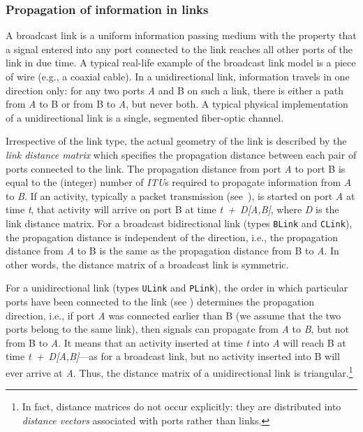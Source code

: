 \subsubsection{Propagation of information in links}
\label{rm_to_li_pr}

A broadcast link is a uniform information passing medium with the
property that a signal entered into any port connected to the link
reaches all other ports of the link in due time.
A typical real-life example of the broadcast link model is a piece of
wire (e.g., a coaxial cable).
In a unidirectional link, information travels in one direction only: for any two
ports {\em A\/} and {\rm B\/} on such a link, there is either a path from {\em A\/} to {\rm B\/} or
from {\rm B\/} to {\em A\/}, but never both.
A typical physical implementation of a unidirectional link is a single,
segmented fiber-optic channel.

Irrespective of the link type, the actual geometry of the link is described
by the {\em link distance matrix\/} which specifies the propagation distance
between each pair of ports connected to the link.
The propagation distance from port {\em A\/} to port {\rm B\/} is equal to the (integer)
number of {\em ITU\/}s required to propagate information from {\em A\/} to {\em B}.
If an activity, typically a packet transmission (see~),
is started on port {\em A\/} at time {\em t},
that activity will arrive on port {\rm B\/} at time
{\em t~+~D[A,B]}, where
{\em D\/} is the link distance matrix.
For a broadcast bidirectional link (types {\tt BLink} and {\tt CLink}),
the propagation distance is independent of the direction, i.e.,
the propagation distance
from {\em A\/} to {\rm B\/} is the same as the propagation distance from {\rm B\/} to {\em A}.
In other words, the distance matrix of a broadcast link is symmetric.

For a unidirectional link (types {\tt ULink} and {\tt PLink}),
the order in which particular ports have been connected to the link (see
)
determines the propagation direction, i.e.,
if port {\em A\/} was connected earlier than {\rm B\/} (we assume that the two ports belong
to the same link), then signals can propagate
from {\em A\/} to {\em B}, but not from {\rm B\/} to {\em A}.
It means that an activity inserted at time {\em t\/} into {\em A\/} will reach {\rm B\/} at
time {\em t~+~D[A,B]\/}---as for a broadcast link, but no activity
inserted into {\rm B\/} will ever arrive at {\em A}.
Thus, the distance matrix of a unidirectional link is
triangular.\footnote{In fact, distance matrices do not occur explicitly:
they are
distributed into {\em distance vectors\/} associated with ports rather
than links.}

